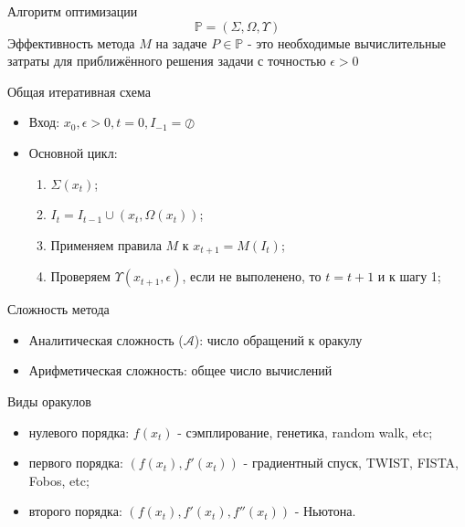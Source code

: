 \documentclass[14pt, fleqn, xcolor={dvipsnames, table}]{beamer}
\begin{document}
\begin{frame}{Алгоритм оптимизации}
  $$
  \mathbb{P} = (\Sigma, \Omega, \Upsilon)
  $$
  Эффективность метода $M$ на задаче $P \in \mathbb{P}$ - это необходимые вычислительные затраты для приближённого решения задачи с точностью $\epsilon > 0$
\end{frame}

\begin{frame}{Общая итеративная схема}
\begin{itemize}
   \item Вход: $x_0, \epsilon > 0, t = 0, I_{-1} = \oslash$ 
   \item Основной цикл:
    \begin{enumerate}
      \item $\Sigma(x_t)$;
      \item $I_t = I_{t-1} \cup (x_t, \Omega(x_t))$;
      \item Применяем правила $M$ к $x_{t+1} = M(I_t)$;
      \item Проверяем $\Upsilon(x_{t+1}, \epsilon)$, если не выполенено, то $t=t+1$ и к шагу 1;
    \end{enumerate}
\end{itemize}
\end{frame}

\begin{frame}{Сложность метода}
\begin{itemize}
   \item Аналитическая сложность ($\mathcal{A}$): число обращений к оракулу
   \item Арифметическая сложность: общее число вычислений
\end{itemize}
\end{frame}


\begin{frame}{Виды оракулов}
\begin{itemize}
   \item нулевого порядка: $f(x_t)$ - сэмплирование, генетика, random walk, etc;
   \item первого порядка: $(f(x_t), f'(x_t))$ - градиентный спуск, TWIST, FISTA, Fobos, etc;
   \item второго порядка: $(f(x_t), f'(x_t), f''(x_t))$ - Ньютона.
\end{itemize}
\end{frame}
\end{document}
